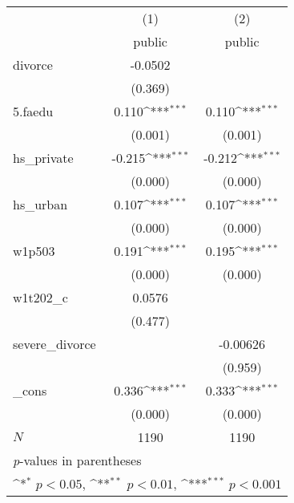 {
\def\sym#1{\ifmmode^{#1}\else\(^{#1}\)\fi}
\begin{tabular}{l*{2}{c}}
\hline\hline
            &\multicolumn{1}{c}{(1)}&\multicolumn{1}{c}{(2)}\\
            &\multicolumn{1}{c}{public}&\multicolumn{1}{c}{public}\\
\hline
divorce     &     -0.0502         &                     \\
            &     (0.369)         &                     \\
[1em]
5.faedu     &       0.110\sym{***}&       0.110\sym{***}\\
            &     (0.001)         &     (0.001)         \\
[1em]
hs\_private  &      -0.215\sym{***}&      -0.212\sym{***}\\
            &     (0.000)         &     (0.000)         \\
[1em]
hs\_urban    &       0.107\sym{***}&       0.107\sym{***}\\
            &     (0.000)         &     (0.000)         \\
[1em]
w1p503      &       0.191\sym{***}&       0.195\sym{***}\\
            &     (0.000)         &     (0.000)         \\
[1em]
w1t202\_c    &      0.0576         &                     \\
            &     (0.477)         &                     \\
[1em]
severe\_divorce&                     &    -0.00626         \\
            &                     &     (0.959)         \\
[1em]
\_cons      &       0.336\sym{***}&       0.333\sym{***}\\
            &     (0.000)         &     (0.000)         \\
\hline
\(N\)       &        1190         &        1190         \\
\hline\hline
\multicolumn{3}{l}{\footnotesize \textit{p}-values in parentheses}\\
\multicolumn{3}{l}{\footnotesize \sym{*} \(p<0.05\), \sym{**} \(p<0.01\), \sym{***} \(p<0.001\)}\\
\end{tabular}
}
